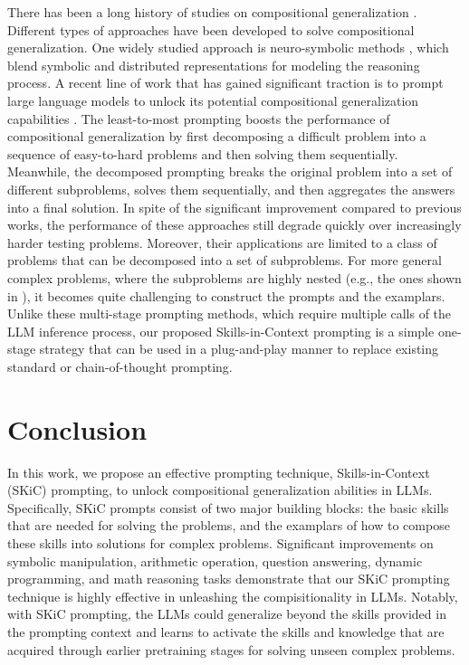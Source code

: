 \documentclass{article} \usepackage{arxiv}
\begin{document}
There has been a long history of studies on compositional generalization \citep{lake2018generalization,jia2016data, andreas2019good,lake2018generalization,ouyang2023compositional,keysers2020measuring,chen2020compositional,dziri2023faith,shao2023compositional,saparov2022language,nye2021show,welleck2022naturalprover,dong2019neural,schwarzschild2021can}. Different types of approaches have been developed to solve compositional generalization. One widely studied approach is neuro-symbolic methods \citep{dong2019neural,schwarzschild2021can}, which blend symbolic and distributed representations for modeling the reasoning process. A recent line of work that has gained significant traction is to prompt large language models to unlock its potential compositional generalization capabilities \citep{nye2021show,zhou2022least,khot2022decomposed,dua2022successive,dziri2023faith}. The least-to-most prompting \citep{zhou2022least} boosts the performance of compositional generalization by first decomposing a difficult problem into a sequence of easy-to-hard problems and then solving them sequentially. Meanwhile, the decomposed prompting \citep{khot2022decomposed} breaks the original problem into a set of different subproblems, solves them sequentially, and then aggregates the answers into a final solution. In spite of the significant improvement compared to previous works, the performance of these approaches still degrade quickly over increasingly harder testing problems. Moreover, their applications are limited to a class of problems that can be decomposed into a set of subproblems. For more general complex problems, where the subproblems are highly nested (e.g., the ones shown in \citet{dziri2023faith}), it becomes quite challenging to construct the prompts and the examplars. Unlike these multi-stage prompting methods, which require multiple calls of the LLM inference process, our proposed Skills-in-Context prompting is a simple one-stage strategy that can be used in a plug-and-play manner to replace existing standard or chain-of-thought prompting.

 
\section{Conclusion}
\label{sec: conclusion}


In this work, we propose an effective prompting technique, Skills-in-Context (SKiC) prompting, to unlock compositional generalization abilities in LLMs. Specifically, SKiC prompts consist of two major building blocks: the basic skills that are needed for solving the problems, and the examplars of how to compose these skills into solutions for complex problems. Significant improvements on symbolic manipulation, arithmetic operation, question answering, dynamic programming, and math reasoning tasks demonstrate that our SKiC prompting technique is highly effective in unleashing the compisitionality in LLMs. Notably, with SKiC prompting, the LLMs could generalize beyond the skills provided in the prompting context and learns to activate the skills and knowledge that are acquired through earlier pretraining stages for solving unseen complex problems. 
\end{document}
